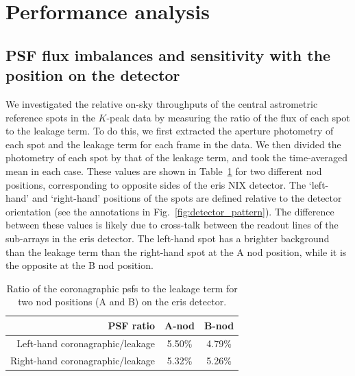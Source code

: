 \documentclass{aa}
\begin{document}
\section{Performance analysis}\label{sec:performance_analysis}

\subsection{PSF flux imbalances and sensitivity with the position on the detector}\label{sect:imbalances}

We investigated the relative on-sky throughputs of the central astrometric reference spots in the $K$-peak data by measuring the ratio of the flux of each spot to the leakage term.
%
To do this, we first extracted the aperture photometry of each spot and the leakage term for each frame in the data.
%
We then divided the photometry of each spot by that of the leakage term, and took the time-averaged mean in each case.
%
These values are shown in Table~\ref{table:measured_ratios} for two different nod positions, corresponding to opposite sides of the \ac{eris} NIX detector.
%
The `left-hand' and `right-hand' positions of the spots are defined relative to the detector orientation (see the annotations in Fig.~\ref{fig:detector_pattern}).
%
The difference between these values is likely due to cross-talk between the readout lines of the sub-arrays in the \ac{eris} detector.
%
The left-hand spot has a brighter background than the leakage term than the right-hand spot at the A nod position, while it is the opposite at the B nod position.
%

\begin{table}
\begin{center}
\caption{Ratio of the coronagraphic \acp{psf} to the leakage term for two nod positions (A and B) on the \ac{eris} detector.}
\begin{tabular}{rcc}
\toprule
PSF ratio &A-nod&B-nod\\
\midrule
Left-hand coronagraphic/leakage  & 5.50\% & 4.79\% \\
Right-hand coronagraphic/leakage & 5.32\% & 5.26\% \\
\bottomrule
\end{tabular}

\label{table:measured_ratios}
\end{center}
\end{table}
\end{document}
